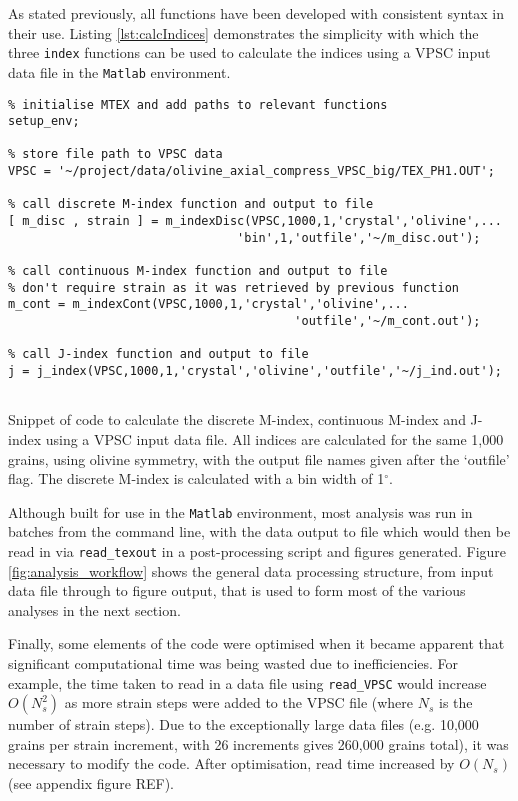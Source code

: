 \documentclass[a4paper,12pt,twoside]{report}
\numberwithin{equation}{chapter}
\begin{document}
As stated previously, all functions have been developed with consistent syntax in their use. Listing \ref{lst:calcIndices} demonstrates the simplicity with which the three \texttt{index} functions can be used to calculate the indices using a VPSC input data file in the \texttt{Matlab} environment.

\begin{program}[htbp] 
   \centering
   \begin{lstlisting}
% initialise MTEX and add paths to relevant functions
setup_env;   
   
% store file path to VPSC data
VPSC = '~/project/data/olivine_axial_compress_VPSC_big/TEX_PH1.OUT';

% call discrete M-index function and output to file
[ m_disc , strain ] = m_indexDisc(VPSC,1000,1,'crystal','olivine',...
                                'bin',1,'outfile','~/m_disc.out');

% call continuous M-index function and output to file
% don't require strain as it was retrieved by previous function
m_cont = m_indexCont(VPSC,1000,1,'crystal','olivine',...
                                        'outfile','~/m_cont.out');

% call J-index function and output to file
j = j_index(VPSC,1000,1,'crystal','olivine','outfile','~/j_ind.out');


 \end{lstlisting}
   \caption{Snippet of code to calculate the discrete M-index, continuous M-index and J-index using a VPSC input data file. All indices are calculated for the same 1,000 grains, using olivine symmetry, with the output file names given after the \lq{}outfile\rq{} flag. The discrete M-index is calculated with a bin width of 1$^\circ$.}
   \label{lst:calcIndices}
\end{program}

Although built for use in the \texttt{Matlab} environment, most analysis was run in batches from the command line, with the data output to file which would then be read in via \texttt{read\_{}texout} in a post-processing script and figures generated. Figure \ref{fig:analysis_workflow} shows the general data processing structure, from input data file through to figure output, that is used to form most of the various analyses in the next section.

Finally, some elements of the code were optimised when it became apparent that significant computational time was being wasted due to inefficiencies. For example, the time taken to read in a data file using \texttt{read\_{}VPSC} would increase $O(N_s^2)$ as more strain steps were added to the VPSC file (where $N_s$ is the number of strain steps). Due to the exceptionally large data files (e.g. 10,000 grains per strain increment, with 26 increments gives 260,000 grains total), it was necessary to modify the code. After optimisation, read time increased by $O(N_s)$ (see appendix figure REF). 
\end{document}
